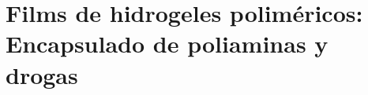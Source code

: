 
\chapter{Films de hidrogeles polim\'ericos: Encapsulado de poliaminas y drogas}
\label{Chapter-film} %




